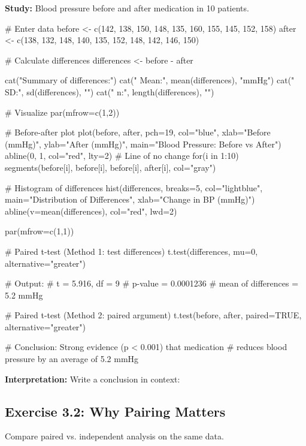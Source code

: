 \documentclass[11pt]{article}
\begin{document}
\textbf{Study:} Blood pressure before and after medication in 10 patients.

\begin{rcode}
# Enter data
before <- c(142, 138, 150, 148, 135, 160, 155, 145, 152, 158)
after <- c(138, 132, 148, 140, 135, 152, 148, 142, 146, 150)

# Calculate differences
differences <- before - after

cat("Summary of differences:\n")
cat("  Mean:", mean(differences), "mmHg\n")
cat("  SD:", sd(differences), "\n")
cat("  n:", length(differences), "\n")

# Visualize
par(mfrow=c(1,2))

# Before-after plot
plot(before, after, pch=19, col="blue",
     xlab="Before (mmHg)", ylab="After (mmHg)",
     main="Blood Pressure: Before vs After")
abline(0, 1, col="red", lty=2)  # Line of no change
for(i in 1:10) {
  segments(before[i], before[i], before[i], after[i], col="gray")
}

# Histogram of differences
hist(differences, breaks=5, col="lightblue",
     main="Distribution of Differences",
     xlab="Change in BP (mmHg)")
abline(v=mean(differences), col="red", lwd=2)

par(mfrow=c(1,1))
\end{rcode}

\newpage

\begin{rcode}
# Paired t-test (Method 1: test differences)
t.test(differences, mu=0, alternative="greater")

# Output:
# t = 5.916, df = 9
# p-value = 0.0001236
# mean of differences = 5.2 mmHg

# Paired t-test (Method 2: paired argument)
t.test(before, after, paired=TRUE, alternative="greater")

# Conclusion: Strong evidence (p < 0.001) that medication
# reduces blood pressure by an average of 5.2 mmHg
\end{rcode}

\textbf{Interpretation:} Write a conclusion in context:

\vspace{2cm}

\subsection{Exercise 3.2: Why Pairing Matters}

Compare paired vs. independent analysis on the same data.
\end{document}
